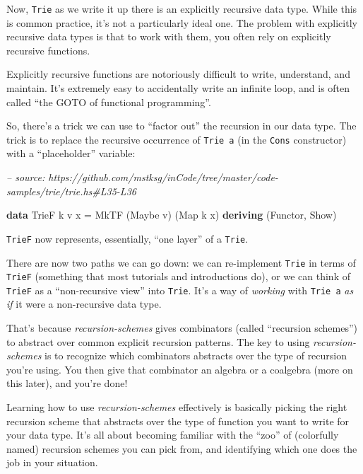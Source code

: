 \documentclass[]{article}
\newenvironment{Shaded}{}{}
\newcommand{\CommentTok}[1]{\textcolor[rgb]{0.38,0.63,0.69}{\textit{#1}}}
\newcommand{\DataTypeTok}[1]{\textcolor[rgb]{0.56,0.13,0.00}{#1}}
\newcommand{\FunctionTok}[1]{\textcolor[rgb]{0.02,0.16,0.49}{#1}}
\newcommand{\KeywordTok}[1]{\textcolor[rgb]{0.00,0.44,0.13}{\textbf{#1}}}
\newcommand{\NormalTok}[1]{#1}
\begin{document}
Now, \texttt{Trie} as we write it up there is an explicitly recursive data type.
While this is common practice, it's not a particularly ideal one. The problem
with explicitly recursive data types is that to work with them, you often rely
on explicitly recursive functions.

Explicitly recursive functions are notoriously difficult to write, understand,
and maintain. It's extremely easy to accidentally write an infinite loop, and is
often called ``the GOTO of functional programming''.

So, there's a trick we can use to ``factor out'' the recursion in our data type.
The trick is to replace the recursive occurrence of \texttt{Trie\ a} (in the
\texttt{Cons} constructor) with a ``placeholder'' variable:

\begin{Shaded}
\begin{Highlighting}[]
\CommentTok{-- source: https://github.com/mstksg/inCode/tree/master/code-samples/trie/trie.hs#L35-L36}

\KeywordTok{data} \DataTypeTok{TrieF}\NormalTok{ k v x }\FunctionTok{=} \DataTypeTok{MkTF}\NormalTok{ (}\DataTypeTok{Maybe}\NormalTok{ v) (}\DataTypeTok{Map}\NormalTok{ k x)}
  \KeywordTok{deriving}\NormalTok{ (}\DataTypeTok{Functor}\NormalTok{, }\DataTypeTok{Show}\NormalTok{)}
\end{Highlighting}
\end{Shaded}

\texttt{TrieF} now represents, essentially, ``one layer'' of a \texttt{Trie}.

There are now two paths we can go down: we can re-implement \texttt{Trie} in
terms of \texttt{TrieF} (something that most tutorials and introductions do), or
we can think of \texttt{TrieF} as a ``non-recursive view'' into \texttt{Trie}.
It's a way of \emph{working} with \texttt{Trie\ a} \emph{as if} it were a
non-recursive data type.

That's because \emph{recursion-schemes} gives combinators (called ``recursion
schemes'') to abstract over common explicit recursion patterns. The key to using
\emph{recursion-schemes} is to recognize which combinators abstracts over the
type of recursion you're using. You then give that combinator an algebra or a
coalgebra (more on this later), and you're done!

Learning how to use \emph{recursion-schemes} effectively is basically picking
the right recursion scheme that abstracts over the type of function you want to
write for your data type. It's all about becoming familiar with the ``zoo'' of
(colorfully named) recursion schemes you can pick from, and identifying which
one does the job in your situation.
\end{document}
